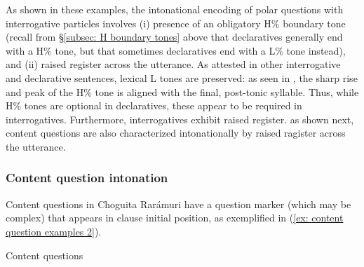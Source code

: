 As shown in these examples, the intonational encoding of polar questions with interrogative particles involves (i) presence of an obligatory H\% boundary tone (recall from §\ref{subsec: H boundary tones} above that declaratives generally end with a H\% tone, but that sometimes declaratives end with a L\% tone instead), and (ii) raised register across the utterance. As attested in other interrogative and declarative sentences, lexical L tones are preserved: as seen in , the sharp rise and peak of the H\% tone is aligned with the final, post-tonic syllable. Thus, while H\% tones are optional in declaratives, these appear to be required in interrogatives. Furthermore, interrogatives exhibit raised register. as shown next, content questions are also characterized intonationally by raised ragister across the utterance.


\subsubsection{Content question intonation}
\label{subsubsec: content question intonation}

Content questions in Choguita Rarámuri have a question marker (which may be complex) that appears in clause initial position, as exemplified in (\ref{ex: content question examples 2}).

\ea\label{ex: content question examples 2}
{Content questions}

    \z
\z

